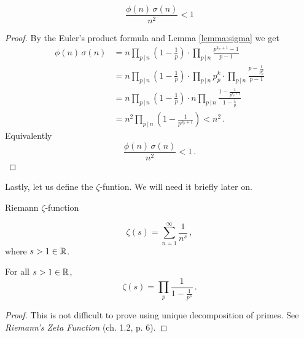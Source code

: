 \documentclass{article}
\begin{document}
\begin{lemma}
\label{thm:sigmafii}
\begin{equation*}
    \frac{\phi(n)\,\sigma(n)}{n^2}<1
\end{equation*}

\begin{proof}
By the Euler's product formula and Lemma \ref{lemma:sigma} we get
\begin{align*}
    \phi(n)\,\sigma(n) & = n\prod_{p\,\vert\, n}\left(1-\frac{1}{p}\right) \cdot \prod_{p\,\vert\, n} \frac{p^{k_p+1}-1}{p-1}\\
    & = n\prod_{p\,\vert\, n}\left(1-\frac{1}{p}\right) \cdot \prod_{p\,\vert\, n} p^k_p \cdot \prod_{p\,\vert\, n} \frac{p-\frac{1}{p^k_p}}{p-1}\\
    & = n\prod_{p\,\vert\, n}\left(1-\frac{1}{p}\right) \cdot n \prod_{p\,\vert\, n}\frac{1-\frac{1}{p^{k_p+1}}}{1-\frac{1}{p}}\\
    & = n^2 \prod_{p\,\vert\, n} \left(1-\frac{1}{p^{k_p+1}}\right) < n^2\,.
\end{align*}
Equivalently
\begin{equation*}
    \frac{\phi(n)\,\sigma(n)}{n^2}<1\,.
\end{equation*}
\end{proof}
\end{lemma}

Lastly, let us define the $\zeta$-funtion. We will need it briefly later on.

\begin{definition}
Riemann $\zeta$-function

\begin{equation*}
    \zeta(s)=\sum_{n=1}^\infty \frac{1}{n^s}\,,
\end{equation*}
where $s>1\in\mathbb{R}$.
\end{definition}

\begin{lemma}
\label{lemma:zeta}
For all $s>1\in\mathbb{R}$, 
\begin{equation*}
    \zeta(s)=\prod_p \frac{1}{1-\frac{1}{p^s}}\,.
\end{equation*}
\begin{proof}
This is not difficult to prove using unique decomposition of primes. See \textit{Riemann's Zeta Function} \cite{Edwards} (ch. 1.2, p. 6).
\end{proof}
\end{lemma}
\end{document}
